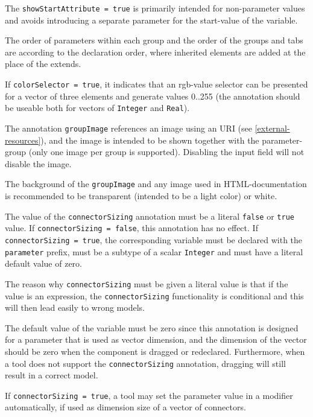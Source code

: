 \begin{nonnormative}
The \lstinline!showStartAttribute = true! is primarily intended for non-parameter values and avoids introducing
a separate parameter for the start-value of the variable.
\end{nonnormative}

The order of parameters within each group and the order of the groups and tabs are according
to the declaration order, where inherited elements are added at the place of the extends.

If \lstinline!colorSelector = true!, it indicates that an rgb-value selector can be
presented for a vector of three elements and generate values 0..255 (the
annotation should be useable both for vectors of \lstinline!Integer! and \lstinline!Real!).

The annotation \lstinline!groupImage! references an image using an URI (see
\cref{external-resources}), and the image is intended to be shown together with the
parameter-group (only one image per group is supported). Disabling the
input field will not disable the image.

The background of the \lstinline!groupImage! and any image used in HTML-documentation is recommended to be transparent (intended to be a light color) or white.

The value of the \lstinline!connectorSizing! annotation must be a literal
\lstinline!false! or \lstinline!true! value. If \lstinline!connectorSizing = false!, this annotation has no effect.
If \lstinline!connectorSizing = true!, the corresponding variable must be declared with the
\lstinline!parameter! prefix, must be a subtype of a scalar \lstinline!Integer! and
must have a literal default value of zero.

\begin{nonnormative}
The reason why \lstinline!connectorSizing! must be given a literal value is that if the value is an expression,
the \lstinline!connectorSizing! functionality is conditional and this will then lead easily to wrong models.

The default value of the variable must be zero since this annotation
is designed for a parameter that is used as vector dimension, and the
dimension of the vector should be zero when the component is dragged or
redeclared.  Furthermore, when a tool does not support the
\lstinline!connectorSizing! annotation, dragging will still result in a correct
model.
\end{nonnormative}

If \lstinline!connectorSizing = true!, a tool may set the parameter value
in a modifier automatically, if used as dimension size of a vector of
connectors.

